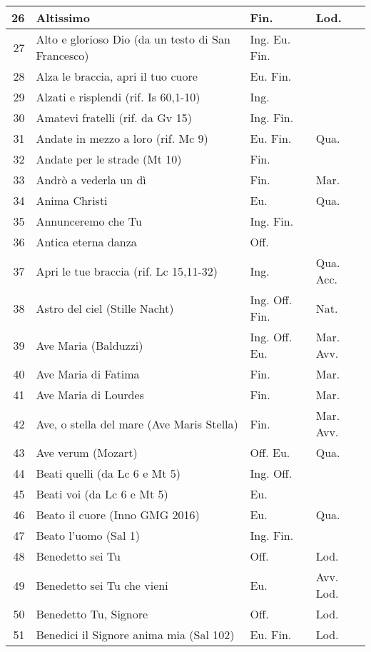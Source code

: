 {\begin{center}
\begin{longtable}{ | r | m{4.7cm} | m{1.8cm} | m{2cm}  |}
    26 & Altissimo & Fin. & Lod.\\ \hline
    27 & Alto e glorioso Dio (da un testo di San Francesco) & Ing. Eu. Fin. & \\ \hline
    28 & Alza le braccia, apri il tuo cuore & Eu. Fin. & \\ \hline
    29 & Alzati e risplendi (rif. Is 60,1-10) & Ing. & \\ \hline
    30 & Amatevi fratelli (rif. da Gv 15) & Ing. Fin. & \\ \hline
    31 & Andate in mezzo a loro (rif. Mc 9) & Eu. Fin. & Qua.\\ \hline
    32 & Andate per le strade (Mt 10) & Fin. & \\ \hline
    33 & Andrò a vederla un dì & Fin. & Mar.\\ \hline
    34 & Anima Christi & Eu. & Qua.\\ \hline
    35 & Annunceremo che Tu & Ing. Fin. & \\ \hline
    36 & Antica eterna danza & Off. & \\ \hline
    37 & Apri le tue braccia (rif. Lc 15,11-32) & Ing. & Qua. Acc.\\ \hline
    38 & Astro del ciel (Stille Nacht) & Ing. Off. Fin. & Nat.\\ \hline
    39 & Ave Maria (Balduzzi) & Ing. Off. Eu. & Mar. Avv.\\ \hline
    40 & Ave Maria di Fatima & Fin. & Mar.\\ \hline
    41 & Ave Maria di Lourdes & Fin. & Mar.\\ \hline
    42 & Ave, o stella del mare (Ave Maris Stella) & Fin. & Mar. Avv.\\ \hline
    43 & Ave verum (Mozart) & Off. Eu. & Qua.\\ \hline
    44 & Beati quelli (da Lc 6 e Mt 5) & Ing. Off. & \\ \hline
    45 & Beati voi (da Lc 6 e Mt 5) & Eu. & \\ \hline
    46 & Beato il cuore (Inno GMG 2016) & Eu. & Qua.\\ \hline
    47 & Beato l'uomo (Sal 1) & Ing. Fin. & \\ \hline
    48 & Benedetto sei Tu & Off. & Lod.\\ \hline
    49 & Benedetto sei Tu che vieni & Eu. & Avv. Lod.\\ \hline
    50 & Benedetto Tu, Signore & Off. & Lod.\\ \hline
    51 & Benedici il Signore anima mia (Sal 102) & Eu. Fin. & Lod.\\ \hline

\end{longtable}
\end{center}}
